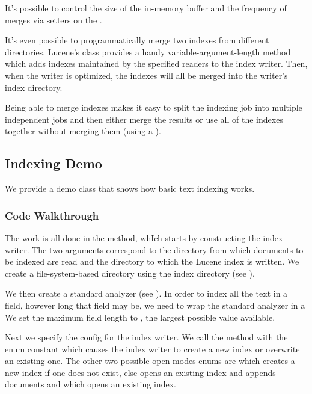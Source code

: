 It's possible to control the size of the in-memory buffer and the
frequency of merges via setters on the .

It's even possible to programmatically merge two indexes from different
directories.  Lucene's  class provides a handy
variable-argument-length method 
which adds indexes maintained by the specified readers to the index
writer.  Then, when the writer is optimized, the indexes will all
be merged into the writer's index directory.  

Being able to merge indexes makes it easy to split the indexing job
into multiple independent jobs and then either merge the results or
use all of the indexes together without merging them (using a
).


\subsection{Indexing Demo}

We provide a demo class  that shows how basic
text indexing works.  

\subsubsection{Code Walkthrough}

The work is all done in the  method, whIch starts by
constructing the index writer.
%
%
The two arguments correspond to the directory from which documents to
be indexed are read and the directory to which the Lucene index is
written.  We create a file-system-based directory using the index
directory (see ).  

We then create a standard analyzer (see ).
In order to index all the text in a field, however long that field may be,
we need to wrap the standard analyzer in a 
We set the maximum field length to , the
largest possible value available.  

Next we specify the config for the index writer.  We call the
 method with the enum constant
 which causes the index writer
to create a new index or overwrite an existing one.  The other two
possible open modes enums are
 which creates a
new index if one does not exist, else opens an existing index
and appends documents and 
which opens an existing index.

